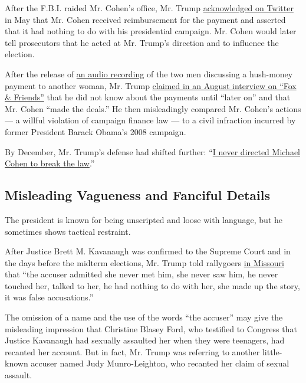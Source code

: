 After the F.B.I. raided Mr. Cohen's office, Mr. Trump
\href{https://twitter.com/realDonaldTrump/status/991992302267785216}{acknowledged
on Twitter} in May that Mr. Cohen received reimbursement for the payment
and asserted that it had nothing to do with his presidential campaign.
Mr. Cohen would later tell prosecutors that he acted at Mr. Trump's
direction and to influence the election.

After the release of
\href{https://www.nytimes3xbfgragh.onion/2018/07/25/us/politics/trump-michael-cohen-recording.html?module=inline}{an
audio recording} of the two men discussing a hush-money payment to
another woman, Mr. Trump
\href{https://www.nytimes3xbfgragh.onion/2018/08/23/us/politics/fact-check-trump-fox-interview.html}{claimed
in an August interview on ``Fox \& Friends''} that he did not know about
the payments until ``later on'' and that Mr. Cohen ``made the deals.''
He then misleadingly compared Mr. Cohen's actions --- a willful
violation of campaign finance law --- to a civil infraction incurred by
former President Barack Obama's 2008 campaign.

By December, Mr. Trump's defense had shifted further:
``\href{https://twitter.com/realDonaldTrump/status/1073205176872435713}{I
never directed Michael Cohen to break the law}.''

\hypertarget{misleading-vagueness-and-fanciful-details}{%
\subsection{Misleading Vagueness and Fanciful
Details}\label{misleading-vagueness-and-fanciful-details}}

The president is known for being unscripted and loose with language, but
he sometimes shows tactical restraint.

After Justice Brett M. Kavanaugh was confirmed to the Supreme Court and
in the days before the midterm elections, Mr. Trump told rallygoers
\href{https://www.c-span.org/video/?453853-1/president-trump-holds-missouri-rally-rush-limbaugh-sean-hannity\&start=3234}{in
Missouri} that ``the accuser admitted she never met him, she never saw
him, he never touched her, talked to her, he had nothing to do with her,
she made up the story, it was false accusations.''

The omission of a name and the use of the words ``the accuser'' may give
the misleading impression that Christine Blasey Ford, who testified to
Congress that Justice Kavanaugh had sexually assaulted her when they
were teenagers, had recanted her account. But in fact, Mr. Trump was
referring to another little-known accuser named Judy Munro-Leighton, who
recanted her claim of sexual assault.

